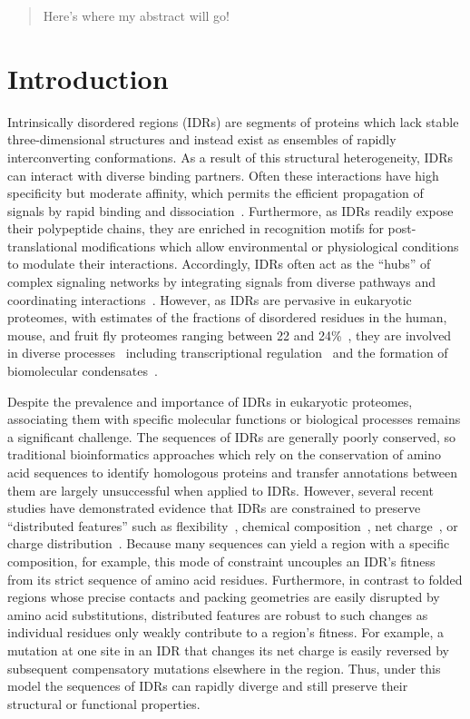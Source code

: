 \begin{abstract}
\noindent
Here's where my abstract will go!
\end{abstract}

\section{Introduction}
Intrinsically disordered regions (IDRs) are segments of proteins which lack stable three-dimensional structures and instead exist as ensembles of rapidly interconverting conformations. As a result of this structural heterogeneity, IDRs can interact with diverse binding partners. Often these interactions have high specificity but moderate affinity, which permits the efficient propagation of signals by rapid binding and dissociation~\cite{Zhou2012, Wright2014}. Furthermore, as IDRs readily expose their polypeptide chains, they are enriched in recognition motifs for post-translational modifications which allow environmental or physiological conditions to modulate their interactions. Accordingly, IDRs often act as the ``hubs'' of complex signaling networks by integrating signals from diverse pathways and coordinating interactions~\cite{Dunker2005, Buljan2012}. However, as IDRs are pervasive in eukaryotic proteomes, with estimates of the fractions of disordered residues in the human, mouse, and fruit fly proteomes ranging between 22 and 24\%~\cite{Piovesan2020, Piovesan2022}, they are involved in diverse processes~\cite{vanderLee2014} including transcriptional regulation~\cite{Liu2006} and the formation of biomolecular condensates~\cite{Banani2017}.

Despite the prevalence and importance of IDRs in eukaryotic proteomes, associating them with specific molecular functions or biological processes remains a significant challenge. The sequences of IDRs are generally poorly conserved, so traditional bioinformatics approaches which rely on the conservation of amino acid sequences to identify homologous proteins and transfer annotations between them are largely unsuccessful when applied to IDRs. However, several recent studies have demonstrated evidence that IDRs are constrained to preserve ``distributed features'' such as flexibility~\cite{Daughdrill2007}, chemical composition~\cite{Moesa2012}, net charge~\cite{Zarin2017}, or charge distribution~\cite{Beh2012}. Because many sequences can yield a region with a specific composition, for example, this mode of constraint uncouples an IDR's fitness from its strict sequence of amino acid residues. Furthermore, in contrast to folded regions whose precise contacts and packing geometries are easily disrupted by amino acid substitutions, distributed features are robust to such changes as individual residues only weakly contribute to a region's fitness. For example, a mutation at one site in an IDR that changes its net charge is easily reversed by subsequent compensatory mutations elsewhere in the region. Thus, under this model the sequences of IDRs can rapidly diverge and still preserve their structural or functional properties.

